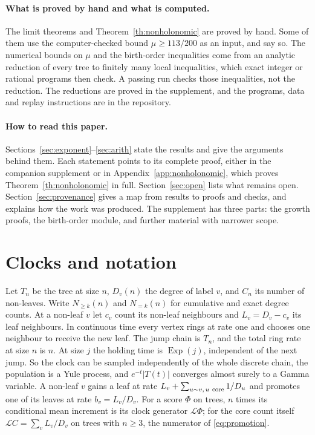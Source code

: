 \documentclass[11pt]{article}
\theoremstyle{remark}
\begin{document}
\paragraph{What is proved by hand and what is computed.} The limit theorems and Theorem~\ref{th:nonholonomic} are proved by hand. Some of them use the computer-checked bound $\mu\ge113/200$ as an input, and say so. The numerical bounds on $\mu$ and the birth-order inequalities come from an analytic reduction of every tree to finitely many local inequalities, which exact integer or rational programs then check. A passing run checks those inequalities, not the reduction. The reductions are proved in the supplement, and the programs, data and replay instructions are in the repository.

\paragraph{How to read this paper.} Sections~\ref{sec:exponent}--\ref{sec:arith} state the results and give the arguments behind them. Each statement points to its complete proof, either in the companion supplement \cite{Supp} or in Appendix~\ref{app:nonholonomic}, which proves Theorem~\ref{th:nonholonomic} in full. Section~\ref{sec:open} lists what remains open. Section~\ref{sec:provenance} gives a map from results to proofs and checks, and explains how the work was produced. The supplement has three parts: the growth proofs, the birth-order module, and further material with narrower scope.

\section{Clocks and notation}\label{sec:clock}
Let $T_n$ be the tree at size $n$, $D_v(n)$ the degree of label $v$, and $C_n$ its number of non-leaves. Write $N_{\ge k}(n)$ and $N_{=k}(n)$ for cumulative and exact degree counts. At a non-leaf $v$ let $c_v$ count its non-leaf neighbours and $L_v=D_v-c_v$ its leaf neighbours. In continuous time every vertex rings at rate one and chooses one neighbour to receive the new leaf. The jump chain is $T_n$, and the total ring rate at size $n$ is $n$. At size $j$ the holding time is $\operatorname{Exp}(j)$, independent of the next jump. So the clock can be sampled independently of the whole discrete chain, the population is a Yule process, and $e^{-t}|T(t)|$ converges almost surely to a Gamma variable. A non-leaf $v$ gains a leaf at rate $L_v+\sum_{u\sim v,\,u\ {\rm core}}1/D_u$ and promotes one of its leaves at rate $b_v=L_v/D_v$. For a score $\Phi$ on trees, $n$ times its conditional mean increment is its clock generator $\mathcal L\Phi$; for the core count itself $\mathcal LC=\sum_vL_v/D_v$ on trees with $n\ge3$, the numerator of \eqref{eq:promotion}.
\end{document}
